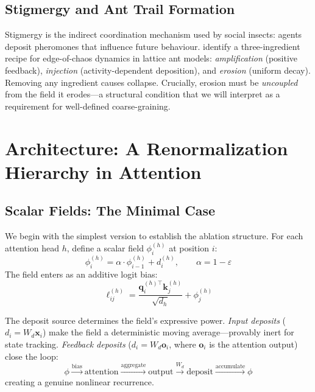 \documentclass[11pt,a4paper]{article}
\newcommand{\field}{\phi}
\newcommand{\deposit}{d}
\newcommand{\evap}{\varepsilon}
\newcommand{\retain}{\alpha}
\newcommand{\x}{\mathbf{x}}
\newcommand{\q}{\mathbf{q}}
\newcommand{\K}{\mathbf{k}}
\begin{document}
\subsection{Stigmergy and Ant Trail Formation}

Stigmergy is the indirect coordination mechanism used by social
insects: agents deposit pheromones that influence future behaviour.
\citet{antpaper} identify a three-ingredient recipe for edge-of-chaos
dynamics in lattice ant models: \emph{amplification} (positive
feedback), \emph{injection} (activity-dependent deposition), and
\emph{erosion} (uniform decay).  Removing any ingredient causes
collapse.  Crucially, erosion must be \emph{uncoupled} from the field
it erodes---a structural condition that we will interpret as a
requirement for well-defined coarse-graining.


\section{Architecture: A Renormalization Hierarchy in Attention}
\label{sec:architecture}

\subsection{Scalar Fields: The Minimal Case}
\label{sec:scalar-field}

We begin with the simplest version to establish the ablation
structure.  For each attention head $h$, define a scalar field
$\field_i^{(h)}$ at position $i$:
\begin{equation}
  \field_i^{(h)} = \retain \cdot \field_{i-1}^{(h)} + \deposit_i^{(h)},
  \qquad \retain = 1 - \evap
  \label{eq:scalar-recurrence}
\end{equation}
The field enters as an additive logit bias:
\begin{equation}
  \ell_{ij}^{(h)}
    = \frac{\q_i^{(h)\top} \K_j^{(h)}}{\sqrt{d_h}}
    + \field_j^{(h)}
  \label{eq:scalar-logit}
\end{equation}

The deposit source determines the field's expressive power.
\emph{Input deposits} ($\deposit_i = W_d \x_i$) make the field a
deterministic moving average---provably inert for state tracking.
\emph{Feedback deposits} ($\deposit_i = W_d \mathbf{o}_i$, where
$\mathbf{o}_i$ is the attention output) close the loop:
\begin{equation}
  \field \xrightarrow{\text{bias}} \text{attention}
  \xrightarrow{\text{aggregate}} \text{output}
  \xrightarrow{W_d} \text{deposit}
  \xrightarrow{\text{accumulate}} \field
  \label{eq:feedback-loop}
\end{equation}
creating a genuine nonlinear recurrence.
\end{document}
